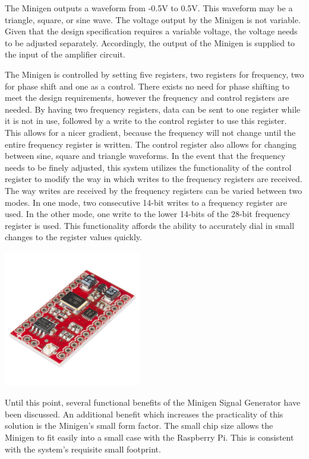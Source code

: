\documentclass{article}	%
\begin{document}
\begin{multicols}{2}
The Minigen outputs a waveform 
from -0.5V to 0.5V. 
This waveform may be a triangle, square, or sine wave.
The voltage output by the Minigen is not variable.
Given that the design specification requires a variable voltage,
the voltage needs to be adjusted separately.
Accordingly, the output of the Minigen 
is supplied to the input of the amplifier circuit.

The Minigen is controlled by setting five registers,
two registers for frequency, 
two for phase shift and 
one as a control. 
There exists no need for phase shifting
to meet the design requirements, 
however the frequency and control registers
are needed. 
By having two frequency registers,
data can be sent to one register while it is not in use,
followed by a write to the control register to use this register.
This allows for a nicer gradient, 
because the frequency will not change until the entire frequency register is written. 
The control register also allows for changing between sine, square and triangle waveforms.
In the event that the frequency needs to be finely adjusted,
this system utilizes the functionality of the control register
to modify the way in which writes to the frequency registers are received.
The way writes are received by the frequency registers 
can be varied between two modes.
In one mode,
two consecutive 14-bit writes to a frequency register are used.
In the other mode,
one write to the lower 14-bits of the 28-bit frequency register is used.
This functionality affords the ability to accurately dial in small changes to the register values quickly.

\begin{center}
\includegraphics[width=0.45\textwidth,keepaspectratio]{minigen_real.png}
\end{center}

Until this point,
several functional benefits of the Minigen Signal Generator have been discussed.
An additional benefit which 
increases the practicality of this solution is the Minigen's small form factor.
The small chip size 
allows the Minigen to fit easily into a small case 
with the Raspberry Pi.
This is consistent with the system's requisite small footprint.


\end{multicols}
\end{document}
